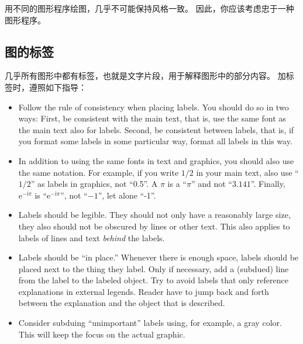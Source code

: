 \bohs

用不同的图形程序绘图，几乎不可能保持风格一致。
因此，你应该考虑忠于一种图形程序。

\eohs

\subsection{图的标签}

\bohs

几乎所有图形中都有标签，也就是文字片段，用于解释图形中的部分内容。
加标签时，遵照如下指导：

\eohs

\begin{itemize}
\item
  Follow the rule of consistency when placing labels. You should do
  so in two ways: First, be consistent with the main text, that is,
  use the same font as the main text also for labels. Second, be
  consistent between labels, that is, if you format some labels in
  some particular way, format all labels in this way.
\item
  In addition to using the same fonts in text and graphics, you should
  also use the same notation. For example, if you write $1/2$ in your
  main text, also use ``$1/2$'' as labels in graphics, not
  ``0.5''. A $\pi$ is a ``$\pi$'' and not ``$3.141$''. Finally,
  $\mathrm e^{-\mathrm i \pi}$ is ``$\mathrm e^{-\mathrm i \pi}$'',
  not ``$-1$'', let alone ``-1''.
\item
  Labels should be legible. They should not only have a reasonably
  large size, they also should not be obscured by lines or other
  text. This also applies to labels of lines and text \emph{behind} the
  labels.
\item
  Labels should be ``in  place.'' Whenever there is enough space,
  labels should be placed next to the thing they label. Only if
  necessary, add a (subdued) line from the label to the labeled
  object. Try to avoid labels that only reference explanations in
  external legends. Reader have to jump back and forth between the
  explanation and the object that is described.
\item
  Consider subduing ``unimportant'' labels using, for example, a gray
  color. This will keep the focus on the actual graphic.
\end{itemize}



